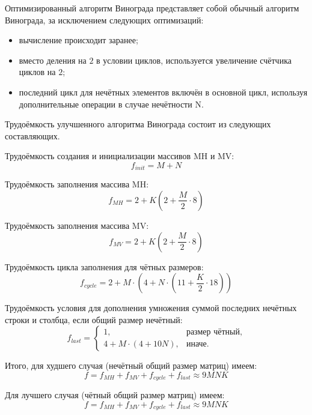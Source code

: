 Оптимизированный алгоритм Винограда представляет собой обычный алгоритм Винограда, за исключением следующих оптимизаций:
\begin{itemize}
	\item вычисление происходит заранее;
	\item вместо деления на $2$ в условии циклов, используется увеличение счётчика циклов на $2$;
	\item последний цикл для нечётных элементов включён в основной цикл,
	используя дополнительные операции в случае нечётности N.
\end{itemize}


Трудоёмкость улучшенного алгоритма Винограда состоит из следующих составляющих.

Трудоёмкость создания и инициализации массивов MH и MV:
\begin{equation}
	\label{for:impr_init}
	f_{init} = M + N
\end{equation}

Трудоёмкость заполнения массива MH:
\begin{equation}
	\label{for:impr_MH}
	f_{MH} =  2 + K (2 + \frac{M}{2} \cdot 8)
\end{equation}

Трудоёмкость заполнения массива MV:
\begin{equation}
	\label{for:impr_MV}
	f_{MV} =  2 + K (2 + \frac{M}{2} \cdot 8)
\end{equation}

Трудоёмкость цикла заполнения для чётных размеров:
\begin{equation}
	\label{for:impr_cycle}
	f_{cycle} =2 + M \cdot (4 + N \cdot (11 + \frac{K}{2} \cdot 18))
\end{equation}

Трудоёмкость условия для дополнения умножения суммой последних нечётных строки и столбца, если общий размер нечётный:
\begin{equation}
	\label{for:impr_last}
	f_{last} = 
	\begin{cases}
		1, & \text{размер чётный,}\\
		4 + M \cdot (4 + 10N), & \text{иначе.}
	\end{cases}
\end{equation}

Итого, для худшего случая (нечётный общий размер матриц) имеем:
\begin{equation}
	\label{for:bad_impr}
	f = f_{MH} + f_{MV} + f_{cycle} + f_{last} \approx 9MNK
\end{equation}

Для лучшего случая (чётный общий размер матриц) имеем:
\begin{equation}
	\label{for:good_impr}
	f = f_{MH} + f_{MV} + f_{cycle} + f_{last} \approx 9MNK
\end{equation}

